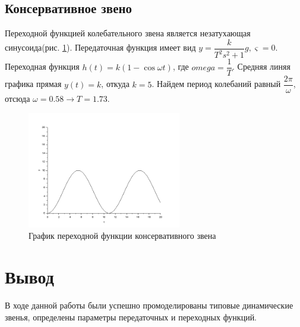 \documentclass[a4paper,12pt,russian]{article} %
\begin{document}
\subsection{Консервативное звено}
Переходной функцией колебательного звена является незатухающая синусоида(рис. \ref{plot_con}). Передаточная функция имеет вид $y=\dfrac{k}{T^2s^2+1}g, \varsigma=0$.
Переходная функция $h(t)=k(1-\cos \omega t)$, где $omega=\dfrac{1}{T}$. Средняя линяя графика прямая $y(t)=k$, откуда $k=5$. Найдем период колебаний равный $\dfrac{2 \pi}{\omega}$, отсюда $\omega=0.58 \rightarrow T=1.73$. 
\begin{figure}[H]
	\centering\includegraphics[width=0.6\textwidth]{plot_con.png}
	\caption{График переходной функции консервативного звена}\label{plot_con}
\end{figure}

\section{Вывод}
В ходе данной работы были успешно промоделированы типовые динамические звенья, определены параметры передаточных и переходных функций.
\end{document}
